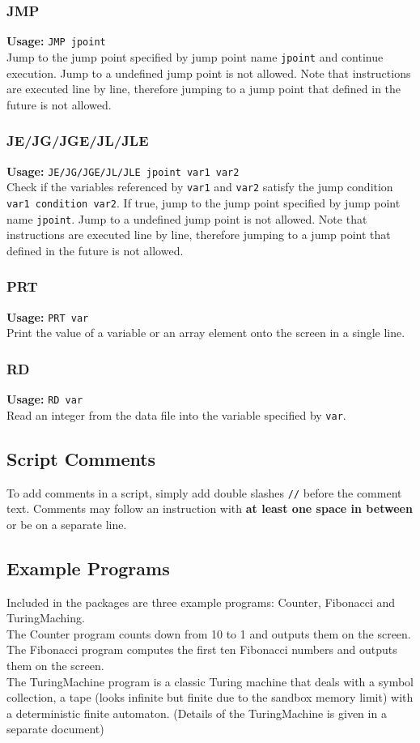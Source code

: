 \documentclass[11pt]{article}
\begin{document}
\subsubsection{JMP}
{\bf Usage:} {\tt JMP jpoint}\\
Jump to the jump point specified by jump point name {\tt jpoint} and continue execution. Jump to a undefined jump point is not allowed. Note that instructions are executed line by line, therefore jumping to a jump point that defined in the future is not allowed.
\subsubsection{JE/JG/JGE/JL/JLE}
{\bf Usage:} {\tt JE/JG/JGE/JL/JLE jpoint var1 var2}\\
Check if the variables referenced by {\tt var1} and {\tt var2} satisfy the jump condition {\tt var1 condition var2}. If true, jump to the jump point specified by jump point name {\tt jpoint}. Jump to a undefined jump point is not allowed. Note that instructions are executed line by line, therefore jumping to a jump point that defined in the future is not allowed.
\subsubsection{PRT}
{\bf Usage:} {\tt PRT var}\\
Print the value of a variable or an array element onto the screen in a single line.
\subsubsection{RD}
{\bf Usage:} {\tt RD var}\\
Read an integer from the data file into the variable specified by {\tt var}.

\subsection{Script Comments}
To add comments in a script, simply add double slashes {\tt //} before the comment text. Comments may follow an instruction with {\bf at least one space in between} or be on a separate line. 


\subsection{Example Programs}
Included in the packages are three example programs: Counter, Fibonacci and TuringMaching.\\
The Counter program counts down from 10 to 1 and outputs them on the screen.\\
The Fibonacci program computes the first ten Fibonacci numbers and outputs them on the screen.\\
The TuringMachine program is a classic Turing machine that deals with a symbol collection, a tape (looks infinite but finite due to the sandbox memory limit) with a deterministic finite automaton. (Details of the TuringMachine is given in a separate document)
\end{document}
